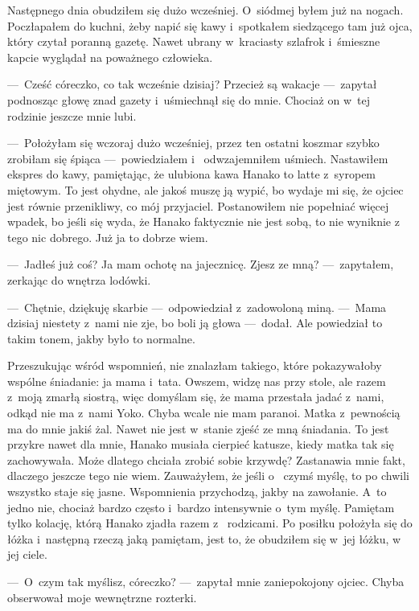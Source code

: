 \paraSep

Następnego dnia obudziłem się dużo wcześniej. O~siódmej byłem już na nogach. Poczłapałem do kuchni, żeby napić się 
kawy i~spotkałem siedzącego tam już ojca, który czytał poranną gazetę. Nawet ubrany w~kraciasty szlafrok i~śmieszne 
kapcie wyglądał na poważnego człowieka. 

---~Cześć córeczko, co tak wcześnie dzisiaj? Przecież są wakacje ---~zapytał podnosząc głowę znad gazety i~uśmiechnął 
się do mnie. Chociaż on w~tej rodzinie jeszcze mnie lubi.

---~Położyłam się wczoraj dużo wcześniej, przez ten ostatni koszmar szybko zrobiłam się śpiąca ---~powiedziałem i~
odwzajemniłem uśmiech. Nastawiłem ekspres do kawy, pamiętając, że ulubiona kawa Hanako to latte z~syropem miętowym. 
To jest ohydne, ale jakoś muszę  ją wypić, bo wydaje mi się, że ojciec jest równie przenikliwy, co mój przyjaciel. 
Postanowiłem nie popełniać więcej wpadek, bo jeśli się wyda, że Hanako faktycznie nie jest sobą, to nie wyniknie z~
tego nic dobrego. Już ja to dobrze wiem.

---~Jadłeś już coś? Ja mam ochotę na jajecznicę. Zjesz ze mną? ---~zapytałem, zerkając do wnętrza lodówki.

---~Chętnie, dziękuję skarbie ---~odpowiedział z~zadowoloną miną. ---~Mama dzisiaj niestety z~nami nie zje, bo boli 
ją głowa ---~dodał. Ale powiedział to takim tonem, jakby było to normalne. 

Przeszukując wśród wspomnień, nie znalazłam takiego, które pokazywałoby wspólne śniadanie: ja mama i~tata. Owszem, 
widzę nas przy stole, ale razem z~moją zmarłą siostrą, więc domyślam się, że mama przestała jadać z~nami, odkąd nie 
ma z~nami Yoko. Chyba wcale nie mam paranoi. Matka z~pewnością ma do mnie jakiś żal. Nawet nie jest w~stanie zjeść ze 
mną śniadania. To jest przykre nawet dla mnie, Hanako musiała cierpieć katusze, kiedy matka tak się zachowywała. Może 
dlatego chciała zrobić sobie krzywdę? Zastanawia mnie fakt, dlaczego jeszcze tego nie wiem. Zauważyłem, że jeśli o~
czymś myślę, to po chwili wszystko staje się jasne. Wspomnienia przychodzą, jakby na zawołanie. A~to jedno nie, 
chociaż bardzo często i~bardzo intensywnie o~tym myślę. Pamiętam tylko kolację, którą Hanako zjadła razem z~
rodzicami. Po posiłku położyła się do łóżka i~następną rzeczą jaką pamiętam, jest to, że obudziłem się w~jej łóżku, w~
jej ciele. 

---~O~czym tak myślisz, córeczko? ---~zapytał mnie zaniepokojony ojciec. Chyba obserwował moje wewnętrzne rozterki.


